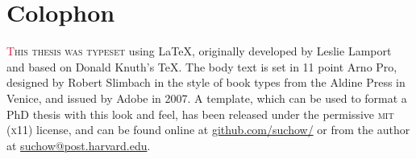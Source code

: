\chapter*{Colophon}

\begin{center}
\parbox{200pt}{\raggedright\lettrine[lines=3,slope=-2pt,nindent=-4pt]{\textcolor{Crimson}{T}}{his thesis was typeset} using \LaTeX, originally developed by Leslie Lamport and based on Donald Knuth's \TeX. The body text is set in 11 point Arno Pro, designed by Robert Slimbach in the style of book types from the Aldine Press in Venice, and issued by Adobe in 2007. A template, which can be used to format a PhD thesis with this look and feel, has been released under the permissive \textsc{mit} (\textsc{x}11) license, and can be found online at \href{https://github.com/suchow/}{github.com/suchow/} or from the author at \href{mailto:suchow@fas.harvard.edu}{suchow@post.harvard.edu}.
}
\end{center}
